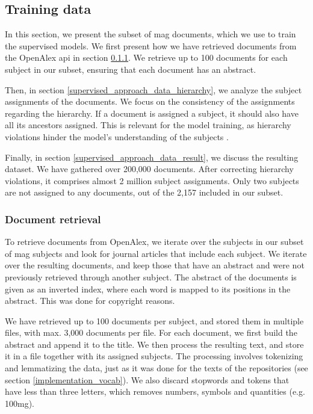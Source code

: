 \subsection{Training data} \label{supervised_approach_data}

In this section, we present the subset of \acrshort{mag} documents, which we use to train the supervised models. We first present how we have retrieved documents from the OpenAlex \acrshort{api} in section \ref{supervised_approach_data_retrieval}. We retrieve up to 100 documents for each subject in our subset, ensuring that each document has an abstract.

Then, in section \ref{supervised_approach_data_hierarchy}, we analyze the subject assignments of the documents. We focus on the consistency of the assignments regarding the hierarchy. If a document is assigned a subject, it should also have all its ancestors assigned. This is relevant for the model training, as hierarchy violations hinder the model's understanding of the subjects \cite{gargiulo2019deep}.

Finally, in section \ref{supervised_approach_data_result}, we discuss the resulting dataset. We have gathered over 200,000 documents. After correcting hierarchy violations, it comprises almost 2 million subject assignments. Only two subjects are not assigned to any documents, out of the 2,157 included in our subset.

\subsubsection{Document retrieval} \label{supervised_approach_data_retrieval}

To retrieve documents from OpenAlex, we iterate over the subjects in our subset of \acrshort{mag} subjects and look for journal articles that include each subject. We iterate over the resulting documents, and keep those that have an abstract and were not previously retrieved through another subject. The abstract of the documents is given as an inverted index, where each word is mapped to its positions in the abstract. This was done for copyright reasons.

We have retrieved up to 100 documents per subject, and stored them in multiple files, with max. 3,000 documents per file. For each document, we first build the abstract and append it to the title. We then process the resulting text, and store it in a file together with its assigned subjects. The processing involves tokenizing and lemmatizing the data, just as it was done for the texts of the repositories (see section \ref{implementation_vocab}). We also discard stopwords and tokens that have less than three letters, which removes numbers, symbols and quantities (e.g. 100mg).

